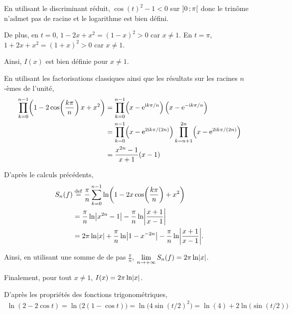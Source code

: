 \begin{solution}
\begin{reponses}
\item En utilisant le discriminant réduit, $\cos(t)^2 - 1 < 0$ sur $\left]0\,;\pi\right[$ donc le trinôme n'admet pas de racine et le logarithme est bien défini.

De plus, en $t = 0$, $1 - 2 x + x^2 = (1 - x)^2 > 0$ car $x \neq 1$.
En $t = \pi$, $1 + 2 x + x^2 = (1 + x)^2 > 0$ car $x \neq 1$.

Ainsi, $I(x)$ est bien définie pour $x \neq 1$.

\item En utilisant les factorisations classiques ainsi que les résultats sur les racines $n$-èmes de l'unité,
\begin{align*}
\prod_{k=0}^{n-1} \mathopen{}\left(1 - 2 \cos\mathopen{}\left(\frac{k\pi}{n}\right) x + x^2\right)
&= \prod_{k=0}^{n-1} \mathopen{}\left(x - \mathrm{e}^{\mathrm{i} k\pi/n}\right) \mathopen{}\left(x - \mathrm{e}^{-\mathrm{i} k\pi/n}\right) \\
&= \prod_{k=0}^{n-1} \mathopen{}\left(x - \mathrm{e}^{2\mathrm{i} k\pi/(2n)}\right) \prod_{k=n+1}^{2n} \mathopen{}\left(x - \mathrm{e}^{2\mathrm{i} k\pi/(2n)}\right) \\
&= \frac{x^{2n} - 1}{x + 1} (x - 1)
\end{align*}

\item D'après le calculs précédents,
\begin{align*}
S_n(f)
&\overset{\mathrm{\tiny def}}{=} \frac{\pi}{n}\sum\limits_{k=0}^{n-1} \ln\mathopen{}\left(1 - 2 x \cos\mathopen{}\left(\frac{k\pi}{n}\right) + x^2\right) \\
&= \frac{\pi}{n} \ln\mathopen{}\abs{x^{2n}-1} - \frac{\pi}{n} \ln \mathopen{}\abs{\frac{x+1}{x-1}} \\
&= 2 \pi \ln\mathopen{}\abs{x} + \frac{\pi}{n} \ln \mathopen{}\abs{1 - x^{-2n}} - \frac{\pi}{n} \ln \mathopen{}\abs{\frac{x+1}{x-1}}.
\end{align*}

Ainsi, en utilisant une somme de  de pas $\frac{\pi}{n}$, $\lim\limits_{n\to +\infty} S_n(f) = 2 \pi \ln\mathopen{}\abs{x}$.

Finalement, pour tout $x \neq 1$, $I(x) = 2 \pi \ln\mathopen{}\abs{x}$.
\item {}D'après les propriétés des fonctions trigonométriques,
\begin{align*}
\ln(2 - 2 \cos t)
= \ln\mathopen{}\big(2(1 - \cos t)\big)
= \ln\mathopen{}\big(4 \sin(t/2)^2\big)
= \ln(4) + 2 \ln\mathopen{}\big(\sin(t/2)\big)
\end{align*}


\end{reponses}
\end{solution}
